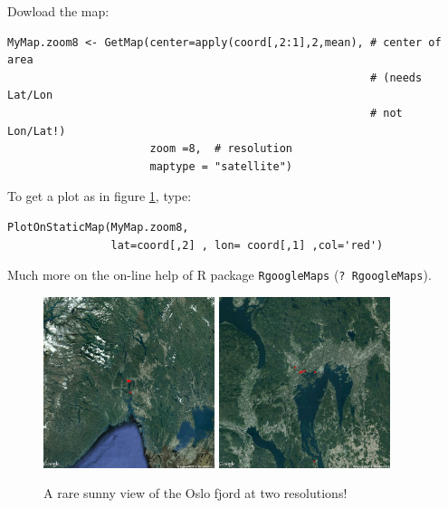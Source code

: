 \documentclass[a4paper,10pt]{article}
\begin{document}
 
\medskip
Dowload the map:

\begin{verbatim}
MyMap.zoom8 <- GetMap(center=apply(coord[,2:1],2,mean), # center of area 
                                                        # (needs Lat/Lon 
                                                        # not Lon/Lat!)
                      zoom =8,  # resolution
                      maptype = "satellite")
\end{verbatim}


\medskip
To get a plot as in figure \ref{fig:Oslo_fjord}, type:

\begin{verbatim}
PlotOnStaticMap(MyMap.zoom8,
                lat=coord[,2] , lon= coord[,1] ,col='red')
\end{verbatim}


\medskip
Much more on the on-line help of R package {\tt RgoogleMaps} ({\tt ? RgoogleMaps}).

\begin{figure}[h]
\hspace{2cm}\includegraphics[width=5cm]{./fig/MyMap_zoom7.jpeg} \hspace{1cm}\includegraphics[width=5cm]{./fig/MyMap_zoom10.jpeg}
\caption{A rare sunny view of the Oslo fjord at two resolutions!}\label{fig:Oslo_fjord}
\end{figure}


\end{document}
